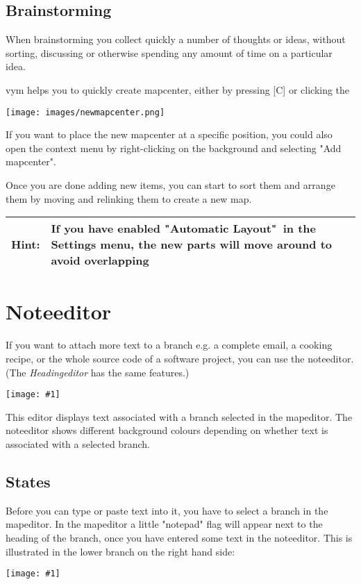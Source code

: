 \documentclass[12pt,a4paper]{article}
\newlength{\maximgwidth}
\newcommand{\maximage}[1]{  
    \begin{center}
        \texttt{[image: \#1]} 
    \end{center}
}
\newcommand{\hint}[1]{
    \begin{center} 
        \begin{tabular}{|rp{12cm}|} \hline
            {\bf Hint}:& #1\\   \hline
        \end{tabular}
            \marginpar{\Huge !} 
    \end{center} 
}
\newcommand{\vym}{{\sc vym }}
\newcommand{\key}[1]{[#1]}
\begin{document}
\subsection{Brainstorming} \label{brainstorming}
When brainstorming you collect quickly a number of thoughts or ideas,
without sorting, discussing or otherwise spending any amount of time on
a particular idea.

\vym helps you to quickly create mapcenter, either by pressing \key{C}
or clicking the 
    \begin{center}
	\texttt{[image: images/newmapcenter.png]}
    \end{center}
If you want to place the new  mapcenter at a specific position, you
could also open the context menu by right-clicking on the background and
selecting "Add mapcenter".

Once you are done adding new items, you can start to sort them and
arrange them by moving and relinking them to create a new map.

\hint{If you have enabled "Automatic Layout"\ in the Settings menu,
the new parts will move around to avoid overlapping}



\section{Noteeditor} \label {noteeditor}
If you want to attach more text to a branch e.g. a complete email, a
cooking recipe, or the whole source code of a software project, you can
use the noteeditor. (The {\em Headingeditor} has the same features.)
    \maximage{images/noteeditor.png}
This editor displays text associated with a branch selected in the
mapeditor. The noteeditor shows different background colours
depending on whether text is associated with a selected branch.

\subsection{States}
Before you can type or paste text into it, you have
to select a branch in the mapeditor.
In the mapeditor a little "notepad" flag will appear
next to the heading of the branch, once you have entered some text in
the noteeditor. This is illustrated in the lower
branch on the right hand side: 
\maximage{images/branches-flags.png}
\end{document}
